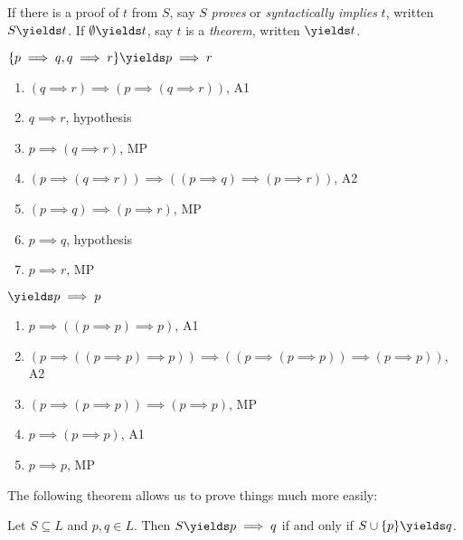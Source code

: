 \documentclass[a4paper]{article}
\begin{document}
\begin{definition}
  If there is a proof of \(t\) from \(S\), say \(S\) \emph{proves} or \emph{syntactically implies} \(t\), written \(S \yields t\). If \(\emptyset \yields t\), say \(t\) is a \emph{theorem}, written \(\yields t\).
\end{definition}

\begin{eg}
  \(\{p \implies q, q \implies r\} \yields p \implies r\)
  \begin{enumerate}
  \item \((q \implies r) \implies (p \implies (q \implies r))\), A1
  \item \(q \implies r\), hypothesis
  \item \(p \implies (q \implies r)\), MP
  \item \((p \implies (q \implies r)) \implies ((p \implies q) \implies (p \implies r))\), A2
  \item \((p \implies q) \implies (p \implies r)\), MP
  \item \(p \implies q\), hypothesis
  \item \(p \implies r\), MP
  \end{enumerate}
\end{eg}

\begin{eg}
  \(\yields p \implies p\)
  \begin{enumerate}
  \item \(p \implies ((p \implies p) \implies p)\), A1
  \item \((p \implies ((p \implies p) \implies p)) \implies ((p \implies (p \implies p)) \implies (p \implies p))\), A2
  \item \((p \implies (p \implies p)) \implies (p \implies p)\), MP
  \item \(p \implies (p \implies p)\), A1
  \item \(p \implies p\), MP
  \end{enumerate}
\end{eg}

The following theorem allows us to prove things much more easily:

\begin{theorem}
  Let \(S \subseteq L\) and \(p, q \in L\). Then \(S \yields p \implies q\) if and only if \(S \cup \{p\} \yields q\).
\end{theorem}
\end{document}
